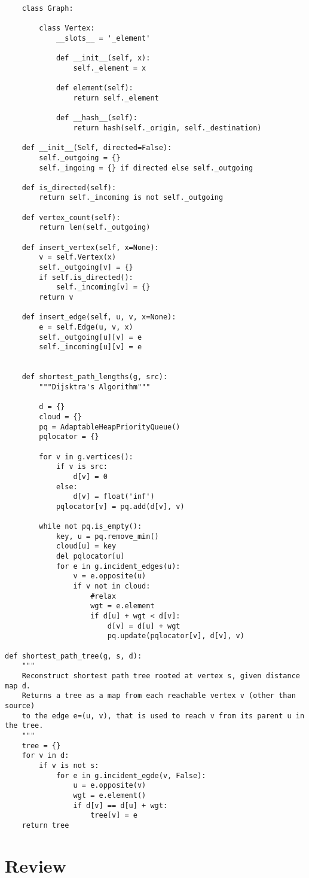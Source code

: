 \documentclass[]{article}
\begin{document}
\begin{lstlisting}
	class Graph:
	
		class Vertex:
			__slots__ = '_element'
			
			def __init__(self, x):
				self._element = x
			
			def element(self):
				return self._element
			
			def __hash__(self):
				return hash(self._origin, self._destination)
		
	def __init__(Self, directed=False):
		self._outgoing = {}
		self._ingoing = {} if directed else self._outgoing
		
	def is_directed(self):
		return self._incoming is not self._outgoing
	
	def vertex_count(self):
		return len(self._outgoing)
		
	def insert_vertex(self, x=None):
		v = self.Vertex(x)
		self._outgoing[v] = {}
		if self.is_directed():
			self._incoming[v] = {}
		return v
		
	def insert_edge(self, u, v, x=None):
		e = self.Edge(u, v, x)
		self._outgoing[u][v] = e
		self._incoming[u][v] = e
		
	
	def shortest_path_lengths(g, src):
		"""Dijsktra's Algorithm"""
		
		d = {}
		cloud = {}
		pq = AdaptableHeapPriorityQueue()
		pqlocator = {}
		
		for v in g.vertices():
			if v is src:
				d[v] = 0
			else:
				d[v] = float('inf')
			pqlocator[v] = pq.add(d[v], v)
			
		while not pq.is_empty():
			key, u = pq.remove_min()
			cloud[u] = key
			del pqlocator[u]
			for e in g.incident_edges(u):
				v = e.opposite(u)
				if v not in cloud:
					#relax
					wgt = e.element
					if d[u] + wgt < d[v]:
						d[v] = d[u] + wgt
						pq.update(pqlocator[v], d[v], v)

def shortest_path_tree(g, s, d):
	"""
	Reconstruct shortest path tree rooted at vertex s, given distance map d.
	Returns a tree as a map from each reachable vertex v (other than source) 
	to the edge e=(u, v), that is used to reach v from its parent u in the tree.
	"""
	tree = {}
	for v in d:
		if v is not s:
			for e in g.incident_egde(v, False):
				u = e.opposite(v)
				wgt = e.element()
				if d[v] == d[u] + wgt:
					tree[v] = e	
	return tree
\end{lstlisting}\bigbreak



\section{Review}\bigbreak\bigbreak
\end{document}

